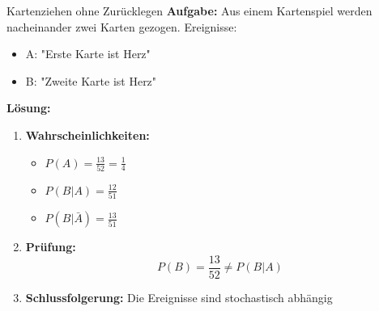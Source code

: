 \begin{example2}{Kartenziehen ohne Zurücklegen}
\textbf{Aufgabe:} Aus einem Kartenspiel werden nacheinander zwei Karten gezogen.
Ereignisse:
\begin{itemize}
\item A: "Erste Karte ist Herz"
\item B: "Zweite Karte ist Herz"
\end{itemize}

\textbf{Lösung:}
\begin{enumerate}
\item \textbf{Wahrscheinlichkeiten:}
   \begin{itemize}
   \item $P(A) = \frac{13}{52} = \frac{1}{4}$
   \item $P(B|A) = \frac{12}{51}$
   \item $P(B|\bar{A}) = \frac{13}{51}$
   \end{itemize}

\item \textbf{Prüfung:}
   $$P(B) = \frac{13}{52} \neq P(B|A)$$

\item \textbf{Schlussfolgerung:} Die Ereignisse sind stochastisch abhängig
\end{enumerate}
\end{example2}



